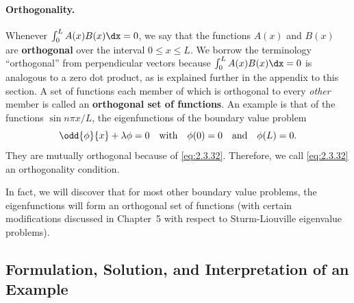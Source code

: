 \paragraph{Orthogonality.}
Whenever $\int_0^L A(x)B(x)\dx = 0$, we say that the functions $A(x)$ and $B(x)$ are \textbf{orthogonal} over the interval $0 \le x \le L$. We borrow the terminology ``orthogonal'' from perpendicular vectors because $\int_0^L A(x)B(x)\dx = 0$ is analogous to a zero dot product, as is explained further in the appendix to this section. A set of functions each member of which is orthogonal to every \emph{other} member is called an \textbf{orthogonal set of functions}. An example is that of the functions $\sin n\pi x/L$, the eigenfunctions of the boundary value problem
\[
\odd{\phi}{x} + \lambda\phi = 0 \quad\text{with}\quad \phi(0) = 0 \quad\text{and}\quad \phi(L) = 0.
\]
They are mutually orthogonal because of \eqref{eq:2.3.32}. Therefore, we call \eqref{eq:2.3.32} an orthogonality condition.

In fact, we will discover that for most other boundary value problems, the eigenfunctions will form an orthogonal set of functions (with certain modifications discussed in Chapter~5 with respect to Sturm-Liouville eigenvalue problems).

\subsection{Formulation, Solution, and Interpretation of an Example}
\label{sec:2.3.7}

